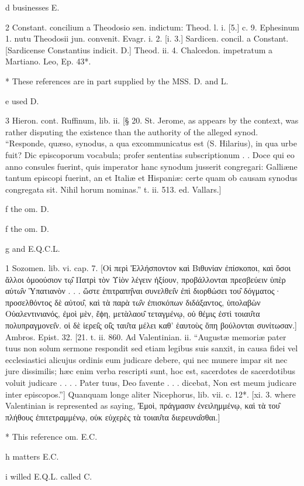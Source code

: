 d
businesses E.

2
Constant. concilium a Theodosio sen. indictum: Theod. l. i. [5.] c. 9. Ephesinum 1. nutu Theodosii jun. convenit. Evagr. i. 2. [i. 3.] Sardicen. concil. a Constant. [Sardicense Constantius indicit. D.] Theod. ii. 4. Chalcedon. impetratum a Martiano. Leo, Ep. 43*.

*
These references are in part supplied by the MSS. D. and L.

e
used D.

3
Hieron. cont. Ruffinum, lib. ii. [§ 20. St. Jerome, as appears by the context, was rather disputing the existence than the authority of the alleged synod. “Responde, quæso, synodus, a qua excommunicatus est (S. Hilarius), in qua urbe fuit? Dic episcoporum vocabula; profer sententias subscriptionum . . Doce qui eo anno consules fuerint, quis imperator hanc synodum jusserit congregari: Galliæne tantum episcopi fuerint, an et Italiæ et Hispaniæ: certe quam ob causam synodus congregata sit. Nihil horum nominas.” t. ii. 513. ed. Vallars.]

f
the om. D.

f
the om. D.

g
and E.Q.C.L.

1
Sozomen. lib. vi. cap. 7. [Οἱ περὶ Ἑλλήσποντον καὶ Βιθυνίαν ἐπίσκοποι, καὶ ὅσοι ἄλλοι ὁμοούσιον τῳ̑ Πατρὶ τὸν Υἱὸν λέγειν ἠξίουν, προβάλλονται πρεσβεύειν ὑπὲρ αὐτω̑ν Ὑπατιανὸν . . . ὥστε ἐπιτραπη̑ναι συνελθει̑ν ἐπὶ διορθώσει του̑ δόγματος· προσελθόντος δὲ αὐτου̑, καὶ τὰ παρὰ τω̑ν ἐπισκόπων διδάξαντος, ὑπολαβὼν Οὐαλεντινιανός, ἐμοὶ μὲν, ἔϕη, μετὰλαου̑ τεταγμένῳ, οὐ θέμις ἐστὶ τοιαυ̑τα πολυπραγμονει̑ν. οἱ δὲ ἱερει̑ς οἱ̑ς ταυ̑τα μέλει καθ’ ἑαυτοὺς ὅπη βούλονται συνίτωσαν.] Ambros. Epist. 32. [21. t. ii. 860. Ad Valentinian. ii. “Augustæ memoriæ pater tuus non solum sermone respondit sed etiam legibus suis sanxit, in causa fidei vel ecclesiastici alicujus ordinis eum judicare debere, qui nec munere impar sit nec jure dissimilis; hæc enim verba rescripti sunt, hoc est, sacerdotes de sacerdotibus voluit judicare . . . . Pater tuus, Deo favente . . . dicebat, Non est meum judicare inter episcopos.”] Quanquam longe aliter Nicephorus, lib. vii. c. 12*. [xi. 3. where Valentinian is represented as saying, Ἐμοὶ, πράγμασιν ἐνειλημμένῳ, καὶ τὰ του̑ πλήθους ἐπιτετραμμένῳ, οὐκ εὐχερὲς τὰ τοιαυ̑τα διερευνα̑σθαι.]

*
This reference om. E.C.

h
matters E.C.

i
willed E.Q.L. called C.

